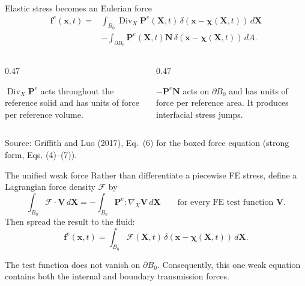 \documentclass[aspectratio=169,11pt]{beamer}
\newcommand{\xvec}{\bm{x}}
\newcommand{\Xvec}{\bm{X}}
\newcommand{\fvec}{\bm{f}}
\newcommand{\Pten}{\bm{P}^{e}}
\newcommand{\lforce}{\bm{\mathcal{F}}}
\newcommand{\normal}{\bm{N}}
\begin{document}
\begin{frame}{Elastic stress becomes an Eulerian force}
\small
\[
\boxed{
\begin{aligned}
\fvec^{e}(\xvec,t)
={}&\int_{B_0}\operatorname{Div}_{X}\Pten(\Xvec,t)\,
\delta\!\left(\xvec-\bm{\chi}(\Xvec,t)\right)\,d\Xvec\\[-1pt]
&-\int_{\partial B_0}\Pten(\Xvec,t)\normal\,
\delta\!\left(\xvec-\bm{\chi}(\Xvec,t)\right)\,dA.
\end{aligned}}
\]

\medskip
\begin{columns}[T,onlytextwidth]
\begin{column}{0.47\textwidth}

\(\operatorname{Div}_{X}\Pten\) acts throughout the reference solid and has units of force per reference volume.
\end{column}
\begin{column}{0.47\textwidth}

\(-\Pten\normal\) acts on \(\partial B_0\) and has units of force per reference area. It produces interfacial stress jumps.
\end{column}
\end{columns}

\vfill
{\scriptsize Source: Griffith and Luo (2017), Eq.~(6) for the boxed force equation (strong form, Eqs. (4)--(7)).}
\end{frame}

\begin{frame}{The unified weak force}
Rather than differentiate a piecewise FE stress, define a Lagrangian force density \(\lforce\) by
\[
\boxed{
\int_{B_0}\lforce\!\cdot\!\bm{V}\,d\Xvec
=-\int_{B_0}\Pten:\nabla_{\!X}\bm{V}\,d\Xvec
\qquad\text{for every FE test function }\bm{V}.}
\]
Then spread the result to the fluid:
\[
\fvec^{e}(\xvec,t)=\int_{B_0}\lforce(\Xvec,t)\,
\delta\!\left(\xvec-\bm{\chi}(\Xvec,t)\right)\,d\Xvec.
\]

\begin{punchbox}
The test function does not vanish on \(\partial B_0\). Consequently, this one weak equation contains both the internal and boundary transmission forces.
\end{punchbox}
\end{frame}
\end{document}
